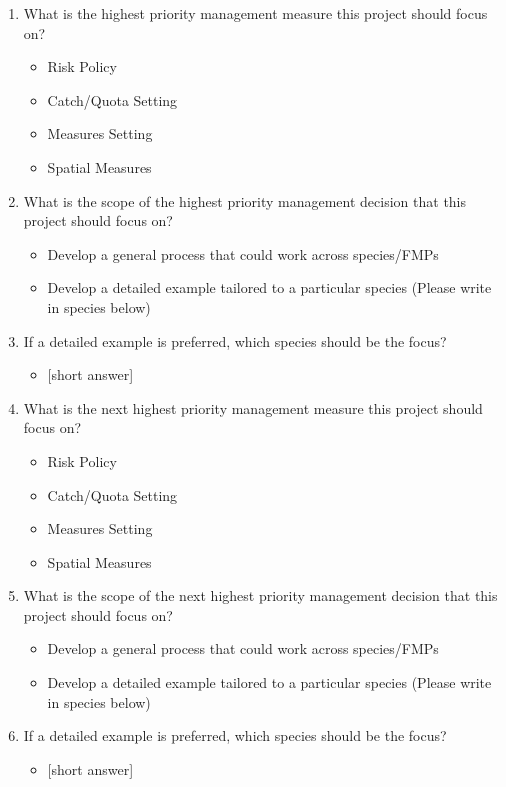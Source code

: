 \documentclass[
]{article}
\providecommand{\tightlist}{%
  \setlength{\itemsep}{0pt}\setlength{\parskip}{0pt}}
\begin{document}
\begin{enumerate}
\def\labelenumi{\arabic{enumi}.}
\tightlist
\item
  What is the highest priority management measure this project should focus on?

  \begin{itemize}
  \tightlist
  \item
    Risk Policy
  \item
    Catch/Quota Setting
  \item
    Measures Setting
  \item
    Spatial Measures
  \end{itemize}
\item
  What is the scope of the highest priority management decision that this project should focus on?

  \begin{itemize}
  \tightlist
  \item
    Develop a general process that could work across species/FMPs
  \item
    Develop a detailed example tailored to a particular species (Please write in species below)
  \end{itemize}
\item
  If a detailed example is preferred, which species should be the focus?

  \begin{itemize}
  \tightlist
  \item
    {[}short answer{]}
  \end{itemize}
\item
  What is the next highest priority management measure this project should focus on?

  \begin{itemize}
  \tightlist
  \item
    Risk Policy
  \item
    Catch/Quota Setting
  \item
    Measures Setting
  \item
    Spatial Measures
  \end{itemize}
\item
  What is the scope of the next highest priority management decision that this project should focus on?

  \begin{itemize}
  \tightlist
  \item
    Develop a general process that could work across species/FMPs
  \item
    Develop a detailed example tailored to a particular species (Please write in species below)
  \end{itemize}
\item
  If a detailed example is preferred, which species should be the focus?

  \begin{itemize}
  \tightlist
  \item
    {[}short answer{]}
  \end{itemize}
\end{enumerate}
\end{document}
